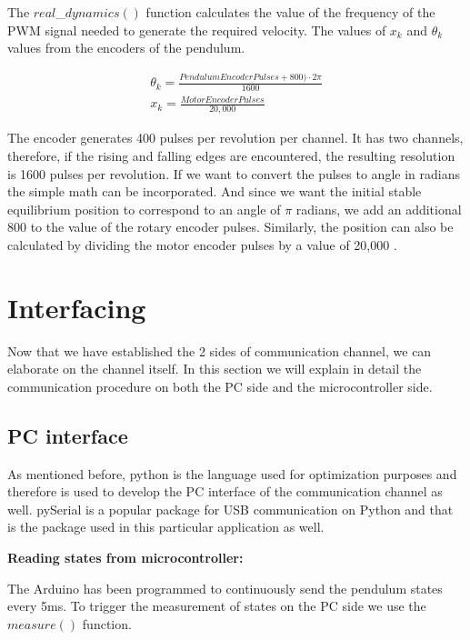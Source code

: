 The $real$\_$dynamics()$ function calculates the value of the frequency of the PWM signal needed to generate the required velocity. The values of $x_k$ and $\theta_k$ values from the encoders of the pendulum. 

\begin{eqnarray}
	\theta_k= \frac{PendulumEncoderPulses+800)\cdot 2\pi}{1600} \\
	x_k =  \frac{MotorEncoderPulses}{20,000}
\end{eqnarray}


The encoder generates 400 pulses per revolution per channel. It has two channels, therefore, if the rising and falling edges are encountered, the resulting resolution is 1600 pulses per revolution. If we want to convert the pulses to angle in radians the simple math can be incorporated. And since we want the initial stable equilibrium position to correspond to an angle of $\pi$ radians, we add an additional 800 to the value of the rotary encoder pulses.
Similarly, the position can also be calculated by dividing the motor encoder pulses by a value of 20,000 \cite{PendulumManual}.






\section{Interfacing}

Now that we have established the 2 sides of communication channel, we can elaborate on the channel itself. In this section we will explain in detail the communication procedure on both the PC side and the microcontroller side.


\subsection{PC interface}

As mentioned before, python is the language used for optimization purposes and therefore is used to develop the PC interface of the communication channel as well. pySerial is a popular package for USB communication on Python and that is the package used in this particular application as well.

\textbf{Reading states from microcontroller:}

The Arduino has been programmed to continuously send the pendulum states every 5ms. To trigger the measurement of states on the PC side we use the $measure()$ function.

